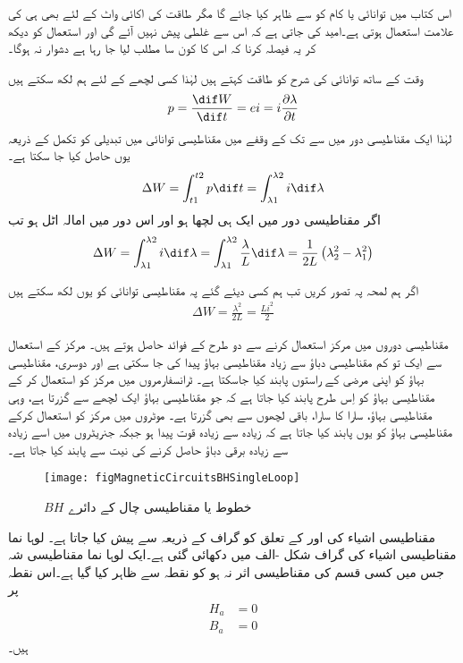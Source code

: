 اس کتاب میں توانائی یا کام کو  سے ظاہر کیا جائے گا مگر طاقت کی اکائی واٹ  کے لئے بھی ہی کی علامت استعمال ہوتی ہے۔امید کی جاتی ہے کہ اس سے غلطی پیش نہیں آئے گی اور استعمال کو دیکھ کر یہ فیصلہ کرنا کہ اس کا کون سا مطلب لیا جا رہا ہے دشوار نہ ہوگا۔

وقت کے ساتھ توانائی کی شرح کو طاقت کہتے ہیں لہٰذا کسی لچھے کے لئے ہم لکھ سکتے ہیں
\begin{align}
p=\frac{\dif W}{\dif t} = e i = i \frac{\partial \lambda}{\partial t}
\end{align} 
لہٰذا ایک مقناطیسی دور میں   سے  تک کے وقفے میں مقناطیسی توانائی میں تبدیلی کو تکمل کے ذریعہ یوں حاصل کیا جا سکتا ہے۔
\begin{align}
\Delta W = \int_{t1}^{t2} p \dif t =\int_{\lambda1}^{\lambda2} i \dif \lambda
\end{align}
اگر مقناطیسی دور میں ایک ہی لچھا ہو اور اس دور میں امالہ اٹل ہو تب
\begin{align}
\Delta W = \int_{\lambda1}^{\lambda2} i \dif \lambda=\int_{\lambda1}^{\lambda2} \frac{\lambda}{L} \dif \lambda=\frac{1}{2 L} \left(\lambda_2^2-\lambda_1^2 \right)
\end{align}

	اگر ہم لمحہ  پہ  تصور کریں تب ہم کسی دیئے گئے  پہ مقناطیسی توانائی کو یوں لکھ سکتے ہیں
\begin{align}
\Delta W=\frac{\lambda^2}{2L}=\frac{L i^2}{2}
\end{align}

مقناطیسی دوروں میں مرکز استعمال کرنے سے دو طرح کے فوائد حاصل ہوتے ہیں۔ مرکز کے استعمال سے ایک تو کم مقناطیسی دباؤ سے زیاد مقناطیسی بہاؤ پیدا کی جا سکتی ہے اور دوسری، مقناطیسی بہاؤ کو اپنی مرضی کے راستوں پابند کیا جاسکتا ہے۔ ٹرانسفارمروں میں مرکز کو استعمال کر کے مقناطیسی بہاؤ کو اِس طرح پابند کیا جاتا ہے کہ جو مقناطیسی بہاؤ ایک لچھے سے گزرتا ہے، وہی مقناطیسی بہاؤ، سارا کا سارا، باقی لچھوں سے بھی گزرتا ہے۔ موٹروں میں مرکز کو استعمال کرکے مقناطیسی بہاؤ کو یوں پابند کیا جاتا ہے کہ زیادہ سے زیادہ قوت پیدا ہو جبکہ جنریٹروں میں اسے زیادہ سے زیادہ برقی دباؤ حاصل کرنے کی نیت سے پابند کیا جاتا ہے۔
\begin{figure}
\centering
\texttt{[image: figMagneticCircuitsBHSingleLoop]}
\caption{$BH$   خطوط یا مقناطیسی چال کے دائرے}
\label{شکل_مقناطیسی_چال}
\end{figure}
مقناطیسی اشیاء کی  اور  کے تعلق کو گراف کے ذریعہ سے پیش کیا جاتا ہے۔ لوہا نما مقناطیسی اشیاء کی   گراف شکل -الف میں دکھائی گئی ہے۔ایک لوہا نما مقناطیسی شہ جس میں کسی قسم کی مقناطیسی اثر نہ ہو کو نقطہ  سے ظاہر کیا گیا ہے۔اس نقطہ پر
\begin{gather}
\begin{aligned}
H_a&=0\\
B_a&=0
\end{aligned}
\end{gather}
ہیں۔

